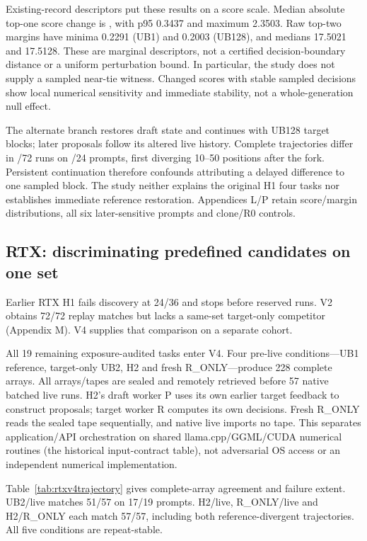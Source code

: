 \begin{samepage}
Existing-record descriptors put these results on a score scale. Median absolute top-one score change is \DerScoreAbsMedian, with p95 0.3437 and maximum 2.3503. Raw top-two margins have minima 0.2291 (UB1) and 0.2003 (UB128), and medians 17.5021 and 17.5128. These are marginal descriptors, not a certified decision-boundary distance or a uniform perturbation bound. In particular, the study does not supply a sampled near-tie witness. Changed scores with stable sampled decisions show local numerical sensitivity and immediate stability, not a whole-generation null effect.
\end{samepage}

The alternate branch restores draft state and continues with UB128 target blocks; later proposals follow its altered live history. Complete trajectories differ in \FUForkLater/72 runs on \FUForkLaterPrompts/24 prompts, first diverging 10--50 positions after the fork. Persistent continuation therefore confounds attributing a delayed difference to one sampled block. The study neither explains the original H1 four tasks nor establishes immediate reference restoration. Appendices L/P retain score/margin distributions, all six later-sensitive prompts and clone/R0 controls.

\subsection{RTX: discriminating predefined candidates on one set}

Earlier RTX H1 fails discovery at 24/36 and stops before reserved runs. V2 obtains 72/72 replay matches but lacks a same-set target-only competitor (Appendix M). V4 supplies that comparison on a separate cohort.

All 19 remaining exposure-audited tasks enter V4. Four pre-live conditions---UB1 reference, target-only UB2, H2 and fresh R\_ONLY---produce 228 complete arrays. All arrays/tapes are sealed and remotely retrieved before 57 native batched live runs. H2's draft worker P uses its own earlier target feedback to construct proposals; target worker R computes its own decisions. Fresh R\_ONLY reads the sealed tape sequentially, and native live imports no tape. This separates application/API orchestration on shared llama.cpp/GGML/CUDA numerical routines (the historical input-contract table), not adversarial OS access or an independent numerical implementation.

Table~\ref{tab:rtxv4trajectory} gives complete-array agreement and failure extent. UB2/live matches 51/57 on 17/19 prompts. H2/live, R\_ONLY/live and H2/R\_ONLY each match 57/57, including both reference-divergent trajectories. All five conditions are repeat-stable.


